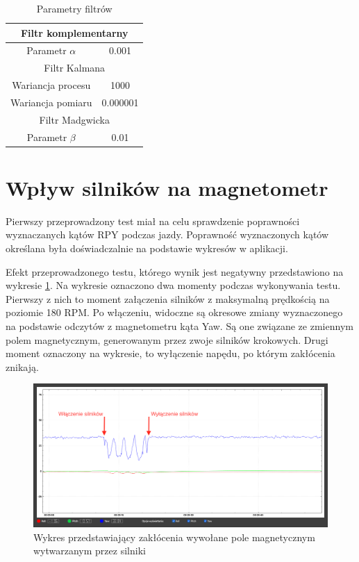 \begin{table}[h!]
    \caption{Parametry filtrów}
    \centering
    \begin{tabular}{|c|c|}
    \hline
    \multicolumn{2}{|c|}{Filtr komplementarny} \\ \hline
    Parametr $\alpha$              & 0.001              \\ \hline
    \hline
    \multicolumn{2}{|c|}{Filtr Kalmana} \\ \hline
    Wariancja procesu & 1000           \\ \hline
    Wariancja pomiaru & 0.000001       \\ \hline
    \hline
    \multicolumn{2}{|c|}{Filtr Madgwicka} \\ \hline
    Parametr $\beta$              & 0.01              \\ \hline
    \end{tabular}
	\label{Parametry filtrow}
\end{table}

\section{Wpływ silników na magnetometr}

Pierwszy przeprowadzony test miał na celu sprawdzenie poprawności wyznaczanych kątów RPY podczas jazdy. Poprawność wyznaczonych kątów określana była doświadczalnie na podstawie wykresów w aplikacji.

Efekt przeprowadzonego testu, którego wynik jest negatywny przedstawiono na wykresie \ref{Silniki magnetometr}. Na wykresie oznaczono dwa momenty podczas wykonywania testu. Pierwszy z nich to moment załączenia silników z maksymalną prędkością na poziomie 180 RPM. Po włączeniu, widoczne są okresowe zmiany wyznaczonego na podstawie odczytów z magnetometru kąta Yaw. Są one związane ze zmiennym polem magnetycznym, generowanym przez zwoje silników krokowych. Drugi moment oznaczony na wykresie, to wyłączenie napędu, po którym zakłócenia znikają. 

\begin{figure}[h!]
    \centering
    \includegraphics[width=1\textwidth]{Rysunki/Rozdzial07/Wplyw_silnikow_magnetometr.png}
    \caption{Wykres przedstawiający zakłócenia wywołane pole magnetycznym wytwarzanym przez silniki}
    \label{Silniki magnetometr}
\end{figure}

